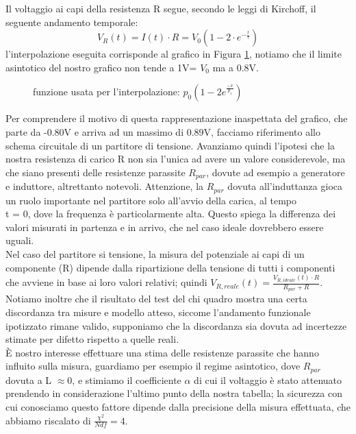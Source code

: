 \documentclass[a4paper]{article}
\theoremstyle{definition}
\begin{document}
\noindent Il voltaggio ai capi della resistenza R segue, secondo le leggi di Kirchoff, il seguente andamento temporale:
\[V_{R}(t) = I(t)\cdot R = V_{0}\left(1 - 2\cdot e^{-\frac{t}{\tau}}\right)\]
l'interpolazione eseguita corrisponde al grafico in Figura \ref{fig:RL_su_R}, notiamo che il limite asintotico del nostro grafico non tende a 1V= \(V_{0}\) ma a 0.8V. \\

\begin{figure}[!ht]

	\caption{funzione usata per l'interpolazione:  \(p_{0}( 1 - 2e^{\frac{-x}{p_{1}}})\) }

    \label{fig:RL_su_R}

\end{figure}
\noindent Per comprendere il motivo di questa rappresentazione inaspettata del grafico, che parte da -0.80V e arriva ad un massimo di 0.89V, facciamo riferimento allo schema circuitale di un partitore di tensione. Avanziamo quindi l'ipotesi che la nostra resistenza di carico R non sia l'unica ad avere un valore considerevole, ma che siano presenti delle resistenze parassite \(R_{par}\), dovute ad esempio a generatore e induttore, altrettanto notevoli. Attenzione, la \(R_{par}\) dovuta all'induttanza gioca un ruolo importante nel partitore solo all'avvio della carica, al tempo\\ t = 0, dove la frequenza è particolarmente alta. Questo spiega la differenza dei valori misurati in partenza e in arrivo, che nel caso ideale dovrebbero essere uguali. \\
Nel caso del partitore si tensione, la misura del potenziale ai capi di un componente (R) dipende dalla ripartizione della tensione di tutti i componenti che avviene in base ai loro valori relativi; quindi \(V_{R, reale}(t) = \frac{V_{R, ideale}(t) \cdot R}{R_{par} + R}\). \\

\noindent Notiamo inoltre che il risultato del test del chi quadro mostra una certa discordanza tra misure e modello atteso, siccome l'andamento funzionale ipotizzato rimane valido, supponiamo che la discordanza sia dovuta ad incertezze stimate per difetto rispetto a quelle reali. \\

\noindent È nostro interesse effettuare una stima delle resistenze parassite che hanno influito sulla misura, guardiamo per esempio il regime asintotico, dove \(R_{par}\) dovuta a L \(\approx 0\), e stimiamo il coefficiente \(\alpha\) di cui il voltaggio è stato attenuato prendendo in considerazione l'ultimo punto della nostra tabella; la sicurezza con cui conosciamo questo fattore dipende dalla precisione della misura effettuata, che abbiamo riscalato di \(\frac{\chi^{2}}{Ndf} = 4\).
\end{document}
